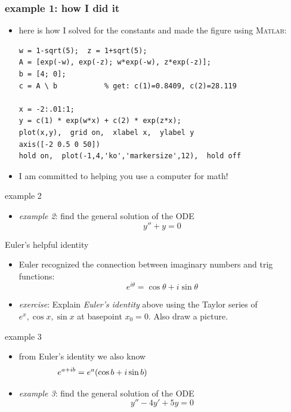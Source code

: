 \documentclass{beamer}
\newcommand{\Matlab}{\textsc{Matlab}}
\begin{document}
\begin{frame}[fragile]
\frametitle{example 1: how I did it}

\begin{itemize}
\item here is how I solved for the constants and made the figure using \Matlab:

\bigskip
\begin{Verbatim}[fontsize=\small]
w = 1-sqrt(5);  z = 1+sqrt(5);
A = [exp(-w), exp(-z); w*exp(-w), z*exp(-z)];
b = [4; 0];
c = A \ b           % get: c(1)=0.8409, c(2)=28.119

x = -2:.01:1;
y = c(1) * exp(w*x) + c(2) * exp(z*x); 
plot(x,y),  grid on,  xlabel x,  ylabel y
axis([-2 0.5 0 50])
hold on,  plot(-1,4,'ko','markersize',12),  hold off
\end{Verbatim}

\bigskip
\item I am committed to helping you use a computer for math!

\end{itemize}
\end{frame}


\begin{frame}{example 2}

\begin{itemize}
\item \emph{example 2}: find the general solution of the ODE
    $$y'' + y = 0$$
\end{itemize}

\vspace{55mm}
\end{frame}


\begin{frame}{Euler's helpful identity}

\begin{itemize}
\item Euler recognized the connection between imaginary numbers and trig functions:
    $$e^{i\theta} = \cos\theta + i \sin\theta$$
\item \emph{exercise}: Explain \emph{Euler's identity} above using the Taylor series of $e^x,\cos x,\sin x$ at basepoint $x_0=0$.  Also draw a picture.
\end{itemize}

\vspace{50mm}
\end{frame}


\begin{frame}{example 3}

\begin{itemize}
\item from Euler's identity we also know
    $$e^{a+ib} = e^a(\cos b + i \sin b) \hspace{50mm}$$
\item \emph{example 3}: find the general solution of the ODE
    $$y''-4y'+5y=0$$
\end{itemize}

\vspace{50mm}
\end{frame}
\end{document}
